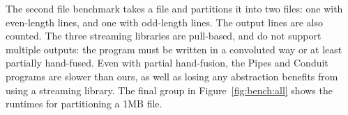 The second file benchmark takes a file and partitions it into two files: one with even-length lines, and one with odd-length lines.
The output lines are also counted.
The three streaming libraries are pull-based, and do not support multiple outputs: the program must be written in a convoluted way or at least partially hand-fused.
Even with partial hand-fusion, the Pipes and Conduit programs are slower than ours, as well as losing any abstraction benefits from using a streaming library.
The final group in Figure~\ref{fig:bench:all} shows the runtimes for partitioning a 1MB file.


%
%
%
